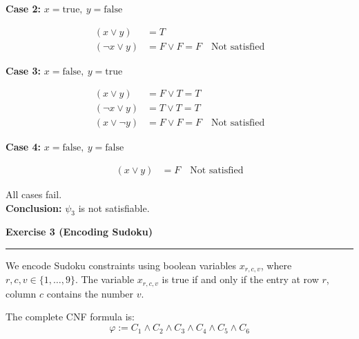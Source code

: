 \documentclass{article}
\theoremstyle{theorem}
\theoremstyle{definition}
\theoremstyle{remark}
\begin{document}
\begin{enumerate}
\begin{flushleft}
    \textbf{Case 2:} $x = \text{true},\ y = \text{false}$

    \begin{align*}
    (x \lor y) &= T \\
    (\neg x \lor y) &= F \lor F = F \quad \text{Not satisfied}
    \end{align*}

    \textbf{Case 3:} $x = \text{false},\ y = \text{true}$

    \begin{align*}
    (x \lor y) &= F \lor T = T \\
    (\neg x \lor y) &= T \lor T = T \\
    (x \lor \neg y) &= F \lor F = F \quad \text{Not satisfied}
    \end{align*}

    \textbf{Case 4:} $x = \text{false},\ y = \text{false}$

    \begin{align*}
    (x \lor y) &= F \quad \text{Not satisfied}
    \end{align*}

    All cases fail.\\
    \textbf{Conclusion:} $\psi_3$ is not satisfiable.
    \end{flushleft}
\end{enumerate}

\textbf{Exercise 3 (Encoding Sudoku)} 
\vspace{0.5em}
\hrule
\vspace{0.5em}

We encode Sudoku constraints using boolean variables \( x_{r,c,v} \), where \( r, c, v \in \{1, \ldots, 9\} \). The variable \( x_{r,c,v} \) is true if and only if the entry at row \( r \), column \( c \) contains the number \( v \).

The complete CNF formula is:
\[
\varphi := C_1 \land C_2 \land C_3 \land C_4 \land C_5 \land C_6
\]
\end{document}

